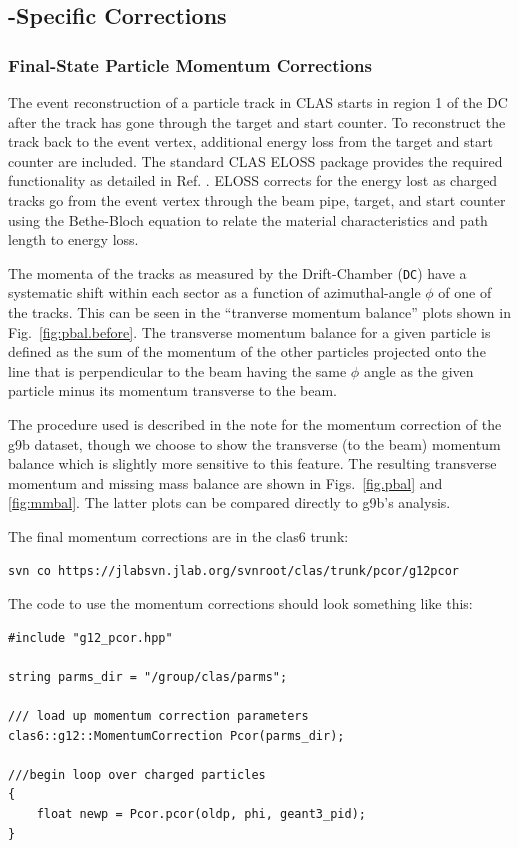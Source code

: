 \subsection{\label{sec:corrections}-Specific Corrections}

\subsubsection{\label{sec:corrections.pcor}Final-State Particle Momentum Corrections}

The event reconstruction of a particle track in CLAS starts in region 1 of the DC after the track has gone through the target and start counter. To reconstruct the track back to the event vertex, additional energy loss from the target and start counter are included. The standard CLAS ELOSS package provides the required functionality as detailed in Ref. \cite{eloss}. ELOSS corrects for the energy lost as charged tracks go from the event vertex through the beam pipe, target, and start counter using the Bethe-Bloch equation \cite{pdg} to relate the material characteristics and path length to energy loss.

The momenta of the tracks as measured by the Drift-Chamber (\texttt{DC}) have a systematic shift within each sector as a function of azimuthal-angle $\phi$ of one of the tracks. This can be seen in the ``tranverse momentum balance'' plots shown in Fig.~\ref{fig:pbal.before}. The transverse momentum balance for a given particle is defined as the sum of the momentum of the other particles projected onto the line that is perpendicular to the beam having the same $\phi$ angle as the given particle minus its momentum transverse to the beam.

The procedure used is described in the  note for the momentum correction of the g9b dataset\cite{clas.note.g9bpcor}, though we choose to show the transverse (to the beam) momentum balance which is slightly more sensitive to this feature. The resulting transverse momentum and missing mass balance are shown in Figs.~\ref{fig.pbal} and \ref{fig:mmbal}. The latter plots can be compared directly to g9b's analysis.

The final  momentum corrections are in the clas6 trunk:
\begin{verbatim}
svn co https://jlabsvn.jlab.org/svnroot/clas/trunk/pcor/g12pcor
\end{verbatim}


The code to use the momentum corrections should look something like this:
\begin{verbatim}
#include "g12_pcor.hpp"

string parms_dir = "/group/clas/parms";

/// load up momentum correction parameters
clas6::g12::MomentumCorrection Pcor(parms_dir);

///begin loop over charged particles
{
    float newp = Pcor.pcor(oldp, phi, geant3_pid);
}
\end{verbatim}

